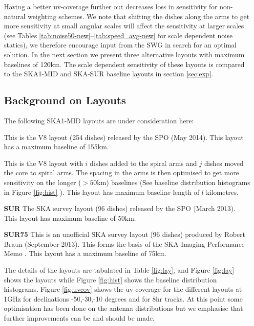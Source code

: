\documentclass[sfheadings,a4paper,times,9pt,floats,floatfix]{article}
\begin{document}
Having a better uv-coverage further out decreases loss in sensitivity for
non-natural weighting schemes. We note that shifting the dishes along the arms to get more sensitivity at small angular
scales will affect the sensitivity at larger scales (see Tables \ref{tab:noise50-new}--\ref{tab:speed_avg-new} for scale
dependent noise statics), we therefore encourage input from the SWG in search for an optimal solution. In the next
section we present three alternative layouts with maximum baselines of 120km. The scale dependent
sensitivity of these layouts is compared to the SKA1-MID and SKA-SUR baseline layouts in section \ref{sec:exp}.

\subsection{Background on Layouts}\label{sec:layouts}
The following SKA1-MID layouts are under consideration here:
\begin{description}
\item[{\bf V8B155}] This is the V8 layout (254 dishes) released by the SPO (May 2014). This layout
has a maximum baseline of 155km.
\item[{\bf W8-$i$C$j$B$l$}] This is the V8 layout with $i$ dishes added
to the spiral arms and $j$ dishes moved the core to spiral arms. The spacing in the arms is then optimised  to get
more sensitivity on the longer ($>50$km) baselines (See baseline distribution histograms in Figure \ref{fig:hist} ).
This layout has maximum baseline length of $l$ kilometres.
\item {\bf SUR} The SKA survey layout (96 dishes) released by the SPO (March 2013). This layout
has maximum baseline of 50km. 
\item {\bf SUR75} This is an unofficial SKA survey layout (96 dishes) produced by Robert Braun
(September 2013). This forms the basis of the SKA Imaging Performance Memo \cite{srd}. This layout has a maximum
baseline of 75km.
\end{description}
The details of the layouts are tabulated in Table \ref{fig:lay}, and Figure \ref{fig:lay} shows the layouts while Figure
\ref{fig:hist} shows the baseline distribution histograms. Figure \ref{fig:uvcov} shows the uv-coverage
for the different layouts at 1GHz for declinations -50,-30,-10  degrees and for 8hr tracks. At this point some
optimisation has been done on the antenna distributions but we emphasise that further improvements can be and should be
made.
\end{document}
